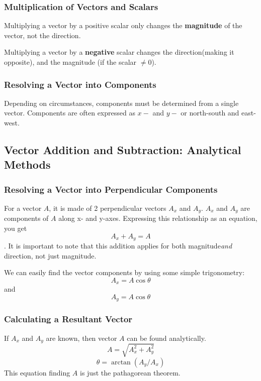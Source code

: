 \documentclass{article}
\begin{document}
\subsubsection{Multiplication of Vectors and Scalars}
Multiplying a vector by a positive scalar only changes the \textbf{magnitude} of the vector, not the direction.

Multiplying a vector by a \textbf{negative} scalar changes the direction(making it opposite), and the magnitude (if the scalar $\neq 0$).

\subsubsection{Resolving a Vector into Components}
Depending on circumstances, components must be determined from a single vector. Components are often expressed as $x-$ and $y-$ or north-south and east-west.

\subsection{Vector Addition and Subtraction: Analytical Methods}
\subsubsection{Resolving a Vector into Perpendicular Components}

For a vector $A$, it is made of 2 perpendicular vectors $A_x$ and $A_y$.
$A_x$ and $A_y$ are components of $A$ along x- and y-axes. Expressing this relationship as an equation, you get \[A_x + A_y = A\].
It is important to note that this addition applies for both magnitude\emph{and} direction, not just magnitude.

We can easily find the vector components by using some simple trigonometry:\[A_x = A\cos \theta\] and \[A_y = A\cos \theta\]

\subsubsection{Calculating a Resultant Vector}

If $A_x$ and $A_y$ are known, then vector $A$ can be found analytically. \[A = \sqrt{A_x^2 + A_y^2}\] \[\theta = \arctan (A_y/A_x)\]
This equation finding $A$ is just the pathagorean theorem.
\end{document}
